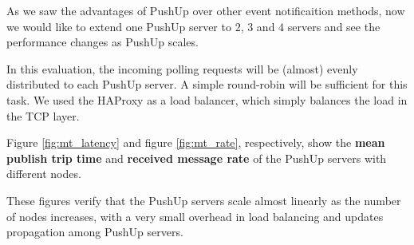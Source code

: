 As we saw the advantages of PushUp over other event notificaition methods, 
now we would like to extend one PushUp server to $2$,  $3$ and $4$ servers
and see the performance changes as PushUp scales.

In this evaluation, the incoming polling requests will be (almost) evenly 
distributed to each PushUp server. A simple round-robin will be sufficient 
for this task. We used the HAProxy\cite{HAProxy} as a load balancer, which
simply balances the load in the TCP layer.

Figure \ref{fig:mt_latency} and figure \ref{fig:mt_rate}, respectively, show
the {\bf mean publish trip time} and {\bf received message rate} of the 
PushUp servers with different nodes.

These figures verify that the PushUp servers scale almost linearly as the 
number of nodes increases, with a very small overhead in load balancing 
and updates propagation among PushUp servers.

